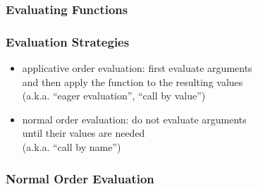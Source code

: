 \documentclass[dvipsnames]{beamer}
\theoremstyle{plain}
\begin{document}
\begin{frame}[fragile]
  \frametitle{Evaluating Functions}

  \begin{example}

    \pause
    \medskip

    \pause
    \medskip

    \pause
    \medskip

    \pause
    \medskip

    \pause
    \medskip

    \pause
    \medskip

    \pause
    \medskip
  \end{example}
\end{frame}

\begin{frame}
  \frametitle{Evaluation Strategies}

  \begin{itemize}
    \item \alert{applicative order evaluation}: first evaluate arguments\\
      and then apply the function to the resulting values\\
      (a.k.a. ``eager evaluation'', ``call by value'')

    \pause
    \medskip
    \item \alert{normal order evaluation}: do not evaluate arguments\\
      until their values are needed\\
      (a.k.a. ``call by name'')
  \end{itemize}
\end{frame}

\begin{frame}[fragile]
  \frametitle{Normal Order Evaluation}

  \begin{example}

    \pause
    \medskip

    \pause
    \medskip

    \pause
    \medskip

    \pause
    \medskip

    \pause
    \medskip

    \pause
    \medskip

    \pause
    \medskip

    \pause
    \medskip
  \end{example}
\end{frame}
\end{document}
